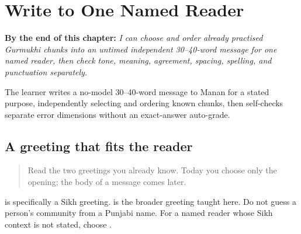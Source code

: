 
\chapter{Write to One Named Reader}
\label{ch:pa-a1-named-reader-message}

\begin{chapteropening}
\textbf{By the end of this chapter:} \emph{I can choose and order already practised Gurmukhi chunks into an untimed independent 30–40-word message for one named reader, then check tone, meaning, agreement, spacing, spelling, and punctuation separately.}

The learner writes a no-model 30–40-word message to Manan for a stated purpose, independently selecting and ordering known chunks, then self-checks separate error dimensions without an exact-answer auto-grade.
\end{chapteropening}

\section[\texorpdfstring{\pa{ਨਮਸਤੇ} · \pa{ਸਤਿ} \pa{ਸ੍ਰੀ} … (namaste · sat …)}{ਨਮਸਤੇ · ਸਤਿ ਸ੍ਰੀ … (namaste · sat …)}]{A greeting that fits the reader}

\label{lesson:PA-W12-greeting-choice}



\begin{quote}
Read the two greetings you already know. Today you choose only the opening; the body of a message comes later.
\end{quote}

\begin{culture}
\textbf{  } is specifically a Sikh greeting. \textbf{} is the broader greeting taught here. Do not guess a person's community from a Punjabi name. For a named reader whose Sikh context is not stated, choose \textbf{}.
\end{culture}

